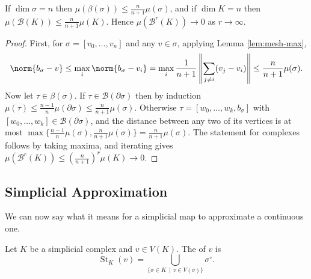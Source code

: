 \documentclass[a4paper]{scrartcl}
\newcommand{\St}{\operatorname{St}}
\newcommand{\bary}{\mathcal{B}}
\begin{document}
\begin{corollary} \label{cor:mesh}
	If $\dim\sigma = n$ then $\mu(\beta(\sigma)) \leq \frac{n}{n+1}\mu(\sigma)$, and if $\dim K = n$ then $\mu(\bary(K))\leq\frac{n}{n+1}\mu(K)$. Hence $\mu(\bary^r(K)) \to 0$ as $r \to \infty$.
\end{corollary}
\begin{proof}
	First, for $\sigma = [v_0,\dots,v_n]$ and any $v \in \sigma$, applying Lemma \ref{lem:mesh-max},
	$$
	\norm{b_\sigma - v} \leq \max_i \norm{b_\sigma - v_i} = \max_i \frac{1}{n+1}\left\|\sum_{j\neq i}(v_j - v_i)\right\| \leq \frac{n}{n+1}\mu(\sigma).
	$$
	Now let $\tau \in \beta(\sigma)$. If $\tau \in \bary(\partial\sigma)$ then by induction $\mu(\tau)\leq\frac{n-1}{n}\mu(\partial\sigma)\leq\frac{n}{n+1}\mu(\sigma)$. Otherwise $\tau = [w_0,\dots,w_k,b_\sigma]$ with $[w_0,\dots,w_k] \in \bary(\partial\sigma)$, and the distance between any two of its vertices is at most $\max\{\frac{n-1}{n}\mu(\sigma), \frac{n}{n+1}\mu(\sigma)\} = \frac{n}{n+1}\mu(\sigma)$. The statement for complexes follows by taking maxima, and iterating gives $\mu(\bary^r(K)) \leq (\frac{n}{n+1})^r\mu(K) \to 0$.
\end{proof}

\subsection{Simplicial Approximation}

We can now say what it means for a simplicial map to approximate a continuous one.

\begin{definition}[Star]
	Let $K$ be a simplicial complex and $v \in V(K)$. The  of $v$ is
	$$
	\St_K(v) = \bigcup_{\{\sigma \in K \,\mid\, v \in V(\sigma)\}} \sigma^\circ.
	$$
\end{definition}

\begin{center}
\end{center}
\end{document}
